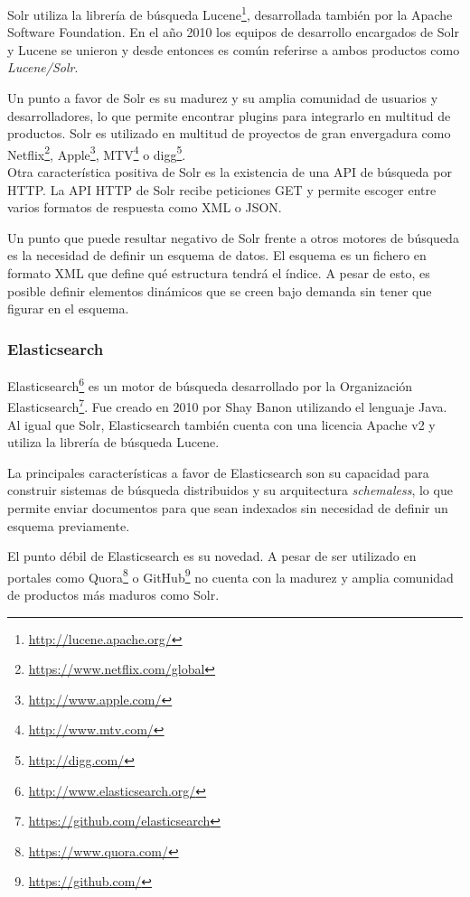 Solr utiliza la librería de búsqueda Lucene\footnote{\url{http://lucene.apache.org/}}, desarrollada también por la Apache Software Foundation.  En el año 2010 los equipos de desarrollo encargados de Solr y Lucene se unieron y desde entonces es común referirse a ambos productos como \textit{Lucene/Solr}.

Un punto a favor de Solr es su madurez y su amplia comunidad de usuarios y desarrolladores, lo que permite encontrar plugins para integrarlo en multitud de productos. Solr es utilizado en multitud de proyectos de gran envergadura como Netflix\footnote{\url{https://www.netflix.com/global}}, Apple\footnote{\url{http://www.apple.com/}}, MTV\footnote{\url{http://www.mtv.com/}} o digg\footnote{\url{http://digg.com/}}.\\
Otra característica positiva de Solr es la existencia de una API de búsqueda por HTTP. La API HTTP de Solr recibe peticiones GET y permite escoger entre varios formatos de respuesta como XML o JSON.

Un punto que puede resultar negativo de Solr frente a otros motores de búsqueda es la necesidad de definir un esquema de datos.  El esquema es un fichero en formato XML que define qué estructura tendrá el índice.  A pesar de esto, es posible definir elementos dinámicos que se creen bajo demanda sin tener que figurar en el esquema.

\subsubsection{Elasticsearch}
Elasticsearch\footnote{\url{http://www.elasticsearch.org/}} es un motor de búsqueda desarrollado por la Organización Elasticsearch\footnote{\url{https://github.com/elasticsearch}}.  Fue creado en 2010 por Shay Banon utilizando el lenguaje Java.  Al igual que Solr, Elasticsearch también cuenta con una licencia Apache v2 y utiliza la librería de búsqueda Lucene.

La principales características a favor de Elasticsearch son su capacidad para construir sistemas de búsqueda distribuidos y su arquitectura \textit{schemaless}, lo que permite enviar documentos para que sean indexados sin necesidad de definir un esquema previamente.

El punto débil de Elasticsearch es su novedad. A pesar de ser utilizado en portales como Quora\footnote{\url{https://www.quora.com/}} o GitHub\footnote{\url{https://github.com/}} no cuenta con la madurez y amplia comunidad de productos más maduros como Solr.


